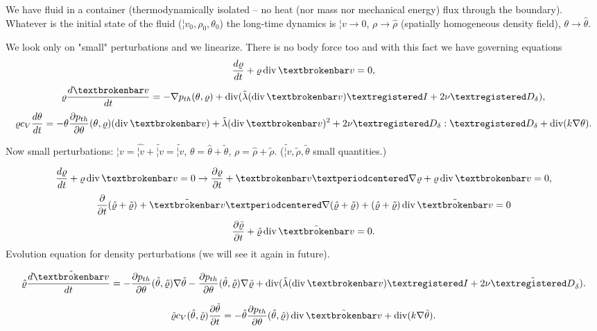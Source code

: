 \documentclass[12pt]{article}					%
\begin{document}
\begin{poznamka}[Stability]
	We have fluid in a container (thermodynamically isolated – no heat (nor mass nor mechanical energy) flux through the boundary). Whatever is the initial state of the fluid ($¦v_0, \rho_0, \theta_0$) the long-time dynamics is $¦v \rightarrow 0$, $\rho \rightarrow \hat{\rho}$ (spatially homogeneous density field), $\theta \rightarrow \hat{\theta}$.

	We look only on "small" perturbations and we linearize. There is no body force too and with this fact we have governing equations
	$$ \frac{d\rho}{dt} + \rho \Div ¦v = 0, $$
	$$ \rho \frac{d¦v}{dt} = - \nabla p_{th}(\theta, \rho) + \Div(\tilde \lambda (\Div ¦v)®I + 2 \nu ®D_\delta), $$
	$$ \rho c_V \frac{d\theta}{dt} = - \theta \frac{\partial p_{th}}{\partial \theta}(\theta, \rho) (\Div ¦v) + \tilde \lambda(\Div ¦v)^2 + 2 \nu ®D_\delta :®D_\delta + \Div(k \nabla \theta). $$

	Now small perturbations: $¦v = \hat{¦v} + \tilde{¦v} = \tilde{¦v}$, $\theta = \hat{\theta} + \tilde \theta$, $\rho = \hat{\rho} + \tilde \rho$. ($\tilde{¦v}, \tilde \rho, \tilde \theta$ small quantities.)

	$$ \frac{d\rho}{dt} + \rho\Div ¦v = 0 \rightarrow \frac{\partial \rho}{\partial t} + ¦v·\nabla \rho + \rho \Div ¦v = 0, $$
	$$ \frac{\partial}{\partial t}(\hat{\rho} + \tilde \rho) + \tilde{¦v}·\nabla (\hat{\rho} + \tilde \rho) + (\hat{\rho} + \tilde \rho) \Div \tilde{¦v} = 0 $$
	$$ \frac{\partial \tilde\rho}{\partial t} + \hat{\rho} \Div \tilde{¦v} = 0. $$
	Evolution equation for density perturbations (we will see it again in future).

	$$ \hat{\rho} \frac{d\tilde{¦v}}{dt} = - \frac{\partial p_{th}}{\partial \theta}(\hat{\theta}, \hat{\rho}) \nabla \tilde \theta - \frac{\partial p_{th}}{\partial \theta}(\hat{\theta}, \hat{\rho}) \nabla \tilde \rho + \Div(\tilde \lambda (\Div ¦v)®I + 2 \nu \tilde{®D}_\delta). $$

	$$ \hat{\rho} c_V(\hat{\theta}, \hat{\rho}) \frac{\partial \tilde \theta}{\partial t} = - \hat{\theta} \frac{\partial p_{th}}{\partial \theta} (\hat{\theta}, \hat{\rho}) \Div \tilde{¦v} + \Div(k \nabla \tilde\theta). $$


\end{poznamka}
\end{document}
